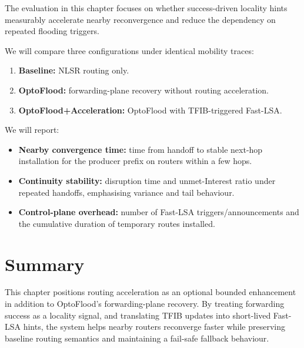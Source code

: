 The evaluation in this chapter focuses on whether success-driven locality hints measurably accelerate nearby reconvergence and reduce the dependency on repeated flooding triggers.

We will compare three configurations under identical mobility traces:

\begin{enumerate}
  \item \textbf{Baseline:} NLSR routing only.
  \item \textbf{OptoFlood:} forwarding-plane recovery without routing acceleration.
  \item \textbf{OptoFlood+Acceleration:} OptoFlood with TFIB-triggered Fast-LSA.
\end{enumerate}

We will report:

\begin{itemize}
  \item \textbf{Nearby convergence time:} time from handoff to stable next-hop installation for the producer prefix on routers within a few hops.
  \item \textbf{Continuity stability:} disruption time and unmet-Interest ratio under repeated handoffs, emphasising variance and tail behaviour.
  \item \textbf{Control-plane overhead:} number of Fast-LSA triggers/announcements and the cumulative duration of temporary routes installed.
\end{itemize}


\section{Summary}
\label{sec:routing_acceleration:summary}

This chapter positions routing acceleration as an optional bounded enhancement in addition to OptoFlood’s forwarding-plane recovery. By treating forwarding success as a locality signal, and translating TFIB updates into short-lived Fast-LSA hints, the system helps nearby routers reconverge faster while preserving baseline routing semantics and maintaining a fail-safe fallback behaviour.